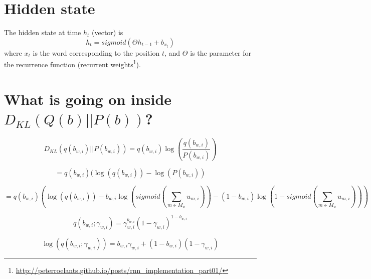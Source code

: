 \documentclass[11pt]{article}
\begin{document}
\section{Hidden state}
The hidden state at time $h_t$ (vector) is
$$
h_t = sigmoid(\Theta h_{t-1} + b_{x_t})
$$
where $x_t$ is the word corresponding to the position $t$, and $\Theta$ is the parameter for the recurrence function (recurrent weights\footnote{\url{http://peterroelants.github.io/posts/rnn_implementation_part01/}}).

\section{What is going on inside $D_{KL}(Q(b)||P(b))$?}

$$
D_{KL}(q(b_{w,i}) || P(b_{w,i})) = q(b_{w,i}) \log(\frac{q(b_{w,i})}{P(b_{w,i})})
$$

$$
= q(b_{w,i}) (\log(q(b_{w,i})) - \log(P(b_{w,i}))
$$

$$
= q(b_{w,i}) (\log(q(b_{w,i})) - b_{w,i} \log(sigmoid(\sum_{m \in M_w} u_{m,i})) - (1 - b_{w,i}) \log(1 - sigmoid(\sum_{m \in M_w} u_{m,i})))
$$


$$
q(b_{w,i};\gamma_{w,i}) = \gamma_{w,i}^{b_{w,i}} (1 - \gamma_{w,i})^{1 - b_{w,i}}
$$

$$
 \log(q(b_{w,i};\gamma_{w,i})) = b_{w,i}\gamma_{w,i} + (1 - b_{w,i})(1 - \gamma_{w,i})
$$







\end{document}
